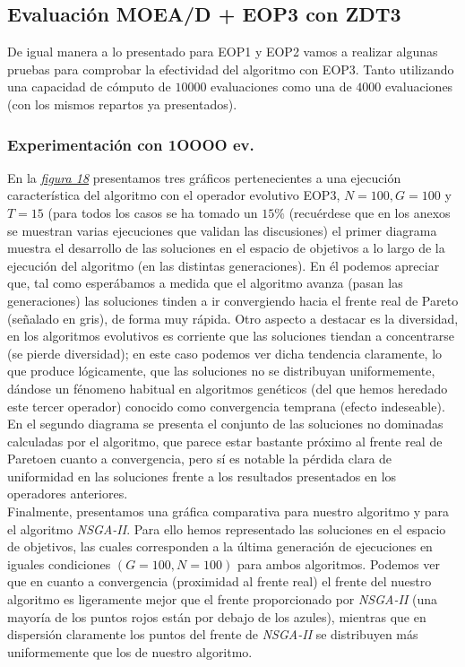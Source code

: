 
\subsection{Evaluación MOEA/D + EOP3 con ZDT3}

De igual manera a lo presentado para EOP1 y EOP2 vamos a realizar algunas pruebas para comprobar la efectividad del algoritmo con EOP3. Tanto utilizando una capacidad de cómputo de $10000$ evaluaciones como una de $4000$ evaluaciones (con los mismos repartos ya presentados).\\

\justify
\subsubsection{Experimentación con 1OOOO ev.}

En la \hyperref[fig:18]{\textit{figura 18}} presentamos tres gráficos pertenecientes a una ejecución característica del algoritmo con el operador evolutivo EOP3, $N=100, G=100$ y $T=15$ (para todos los casos se ha tomado un $15\%$  (recuérdese que en los anexos se muestran varias ejecuciones que validan las discusiones) el primer diagrama muestra el desarrollo de las soluciones en el espacio de objetivos a lo largo de la ejecución del algoritmo (en las distintas generaciones). En él podemos apreciar que, tal como esperábamos a medida que el algoritmo avanza (pasan las generaciones) las soluciones tinden a ir convergiendo hacia el frente real de Pareto (señalado en gris), de forma muy rápida. Otro aspecto a destacar es la diversidad, en los algoritmos evolutivos es corriente que las soluciones tiendan a concentrarse (se pierde diversidad); en este caso podemos ver dicha tendencia claramente, lo que produce lógicamente, que las soluciones no se distribuyan uniformemente, dándose un fénomeno habitual en algoritmos genéticos (del que hemos heredado este tercer operador) conocido como convergencia temprana (efecto indeseable).\\

En el segundo diagrama se presenta el conjunto de las soluciones no dominadas calculadas por el algoritmo, que parece estar bastante próximo al frente real de Paretoen cuanto a convergencia, pero sí es notable la pérdida clara de uniformidad en las soluciones frente a los resultados presentados en los operadores anteriores.\\

Finalmente, presentamos una gráfica comparativa para nuestro algoritmo y para el algoritmo \textit{NSGA-II}. Para ello hemos representado las soluciones en el espacio de objetivos, las cuales corresponden a la última generación de ejecuciones en iguales condiciones $(G=100, N=100)$ para ambos algoritmos. Podemos ver que en cuanto a convergencia (proximidad al frente real) el frente del nuestro algoritmo es ligeramente mejor que el frente proporcionado por  \textit{NSGA-II} (una mayoría de los puntos rojos están por debajo de los azules), mientras que en dispersión claramente los puntos del frente de \textit{NSGA-II} se distribuyen más uniformemente que los de nuestro algoritmo.\\

